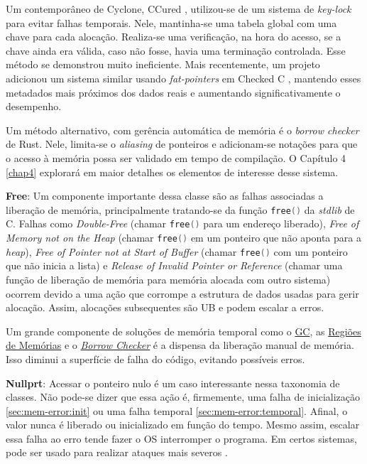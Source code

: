 \label{sec:mem-error:KeyLock}
Um contemporâneo de Cyclone, CCured \cite{CCURED}, utilizou-se de um sistema de \emph{key-lock} para evitar falhas temporais. Nele, mantinha-se uma tabela global com uma chave para cada alocação. Realiza-se uma verificação, na hora do acesso, se a chave ainda era válida, caso não fosse, havia uma terminação controlada. Esse método se demonstrou muito ineficiente. Mais recentemente, um projeto adicionou um sistema similar usando \emph{fat-pointers} em Checked C \cite{FATPOINTERS}, mantendo esses metadados mais próximos dos dados reais e aumentando significativamente o desempenho.

\label{sec:mem-error:BorrowChecker}
Um método alternativo, com gerência automática de memória é o \emph{borrow checker} de Rust. Nele, limita-se o \emph{aliasing} de ponteiros e adicionam-se notações para que o acesso à memória possa ser validado em tempo de compilação. O Capítulo 4 \ref{chap4} explorará em maior detalhes os elementos de interesse desse sistema. 

\newcommand{\FREE}{\lstinline[language=C]|free()| }
\label{sec:mem-error:temporal:free}

\textbf{Free}: Um componente importante dessa classe são as falhas associadas a liberação de memória, principalmente tratando-se da função \FREE da \emph{stdlib} de C. Falhas como \emph{Double-Free} (chamar \FREE para um endereço liberado), \emph{Free of Memory not on the Heap} (chamar \FREE em um ponteiro que não aponta para a \emph{heap}), \emph{Free of Pointer not at Start of Buffer} (chamar \FREE com um ponteiro que não inicia a lista) e \emph{Release of Invalid Pointer or Reference} (chamar uma função de liberação de memória para memória alocada com outro sistema) ocorrem devido a uma ação que corrompe a estrutura de dados usadas para gerir alocação. Assim, alocações subsequentes são UB e podem escalar a erros.

Um grande componente de soluções de memória temporal como o \hyperref[sec:mem-error:GC]{GC}, as \hyperref[sec:mem-error:MemReg]{Regiões de Memórias} e o \hyperref[sec:mem-error:BorrowChecker]{\emph{Borrow Checker}} é a dispensa da liberação manual de memória. Isso diminui a superfície de falha do código, evitando possíveis erros.

\label{sec:mem-error:temporal:null}

\textbf{Nullprt}: Acessar o ponteiro nulo é um caso interessante nessa taxonomia de classes. Não pode-se dizer que essa ação é, firmemente, uma falha de inicialização \ref{sec:mem-error:init} ou uma falha temporal \ref{sec:mem-error:temporal}. Afinal, o valor nunca é liberado ou inicializado em função do tempo. Mesmo assim, escalar essa falha ao erro tende fazer o OS interromper o programa. Em certos sistemas, pode ser usado para realizar ataques mais severos \cite[p.4]{MemErrorPastPresentFuture}.

